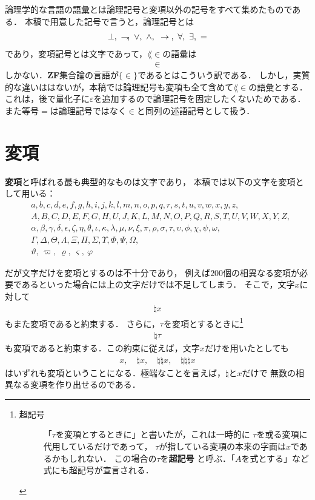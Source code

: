 	論理学的な言語の語彙とは論理記号と変項以外の記号をすべて集めたものである．
	本稿で用意した記号で言うと，論理記号とは
	\begin{align}
		\bot,\ \negation,\ \vee,\ \wedge,\ \rarrow,\ \forall,\ \exists,\ =
	\end{align}
	であり，変項記号とは文字であって，$\lang{\in}$の語彙は
	\begin{align}
		\in
	\end{align}
	しかない．{\bf ZF}集合論の言語が$\{\in\}$であるとはこういう訳である．
	しかし，実質的な違いははないが，本稿では論理記号も変項も全て含めて$\lang{\in}$の語彙とする．
	これは，後で量化子に$\varepsilon$を追加するので論理記号を固定したくないためである．
	また等号$=$は論理記号ではなく$\in$と同列の述語記号として扱う．
	
\section{変項}
\label{sec:variables}
	{\bf 変項}と呼ばれる最も典型的なものは文字であり，
	本稿では以下の文字を変項として用いる：
	\begin{align}
		&a,b,c,d,e,f,g,h,i,j,k,l,m,n,o,p,q,r,s,t,u,v,w,x,y,z, \\
		&A,B,C,D,E,F,G,H,U,J,K,L,M,N,O,P,Q,R,S,T,U,V,W,X,Y,Z, \\
		&\alpha,\beta,\gamma,\delta,\epsilon,\zeta,\eta,\theta,\iota,
			\kappa,\lambda,\mu,\nu,\xi,\pi,\rho,\sigma,\tau,\upsilon,
			\phi,\chi,\psi,\omega, \\
		&\Gamma,\Delta,\Theta,\Lambda,\Xi,\Pi,\Sigma,\Upsilon,\Phi,\Psi,\Omega, \\
		&\vartheta,\ \varpi,\ \varrho,\ \varsigma,\ \varphi
	\end{align}
	
	だが文字だけを変項とするのは不十分であり，
	例えば$200$個の相異なる変項が必要であるといった場合には上の文字だけでは不足してしまう．
	そこで，文字$x$に対して
	\begin{align}
		\natural x
	\end{align}
	もまた変項であると約束する．
	さらに，$\tau$を変項とするときに\footnote{
		\begin{description}
			\item[超記号]
				「$\tau$を変項とするときに」と書いたが，これは一時的に
				$\tau$を或る変項に代用しているだけであって，
				$\tau$が指している変項の本来の字面は$x$であるかもしれない．
				この場合の$\tau$を{\bf 超記号}
				と呼ぶ．「$A$を式とする」など式にも超記号が宣言される．
		\end{description}
	}
	\begin{align}
		\natural \tau
	\end{align}
	も変項であると約束する．この約束に従えば，文字$x$だけを用いたとしても
	\begin{align}
		x,\quad \natural x, \quad \natural \natural x, \quad \natural \natural \natural x
	\end{align}
	はいずれも変項ということになる．極端なことを言えば，$\natural$と$x$だけで
	無数の相異なる変項を作り出せるのである．
	
